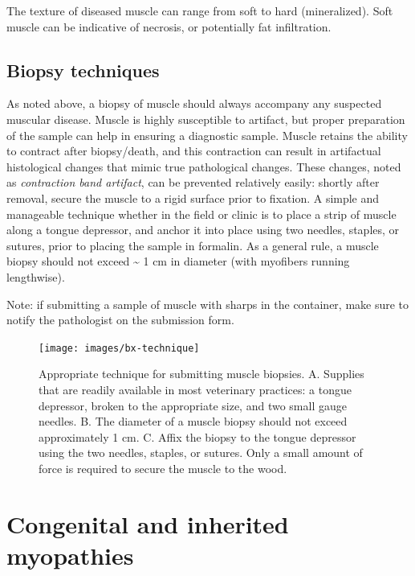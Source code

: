 \documentclass[openany]{report}
\begin{document}
The texture of diseased muscle can range from soft to hard
(mineralized). Soft muscle can be indicative of necrosis, or potentially
fat infiltration.

\section{Biopsy techniques}\label{biopsy-techniques}

As noted above, a biopsy of muscle should always accompany any suspected
muscular disease. Muscle is highly susceptible to artifact, but proper
preparation of the sample can help in ensuring a diagnostic sample.
Muscle retains the ability to contract after biopsy/death, and this
contraction can result in artifactual histological changes that mimic
true pathological changes. These changes, noted as \emph{contraction
band artifact}, can be prevented relatively easily: shortly after
removal, secure the muscle to a rigid surface prior to fixation. A
simple and manageable technique whether in the field or clinic is to
place a strip of muscle along a tongue depressor, and anchor it into
place using two needles, staples, or sutures, prior to placing the
sample in formalin. As a general rule, a muscle biopsy should not exceed
\textasciitilde{} 1 cm in diameter (with myofibers running lengthwise).

Note: if submitting a sample of muscle with sharps in the container,
make sure to notify the pathologist on the submission form.

\begin{figure}

{\centering \texttt{[image: images/bx-technique]} 

}

\caption{Appropriate technique for submitting muscle biopsies. A. Supplies that are readily available in most veterinary practices: a tongue depressor, broken to the appropriate size, and two small gauge needles. B. The diameter of a muscle biopsy should not exceed approximately 1 cm. C. Affix the biopsy to the tongue depressor using the two needles, staples, or sutures. Only a small amount of force is required to secure the muscle to the wood.}\label{fig:bx-technique}
\end{figure}

\chapter{Congenital and inherited
myopathies}\label{congenital-and-inherited-myopathies}
\end{document}

